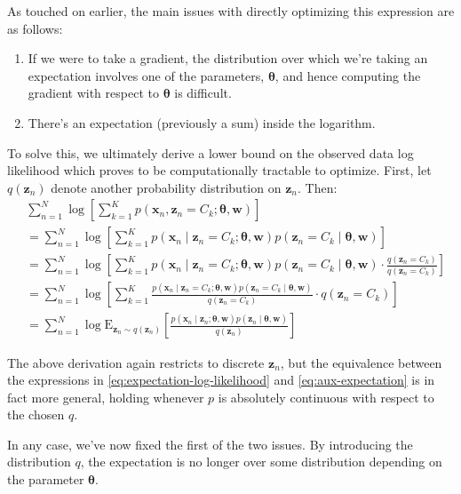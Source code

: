 As touched on earlier, the main issues with directly optimizing this expression are as follows:
\begin{enumerate}
    \item If we were to take a gradient, the distribution over which we're taking an expectation involves one of the parameters, $\boldsymbol\theta$, and hence computing the gradient with respect to $\boldsymbol{\theta}$ is difficult.
    \item There's an expectation (previously a sum) inside the logarithm.
\end{enumerate}

To solve this, we ultimately derive a lower bound on the observed data log likelihood which proves to be computationally tractable to optimize. First, let $q(\mathbf{z}_n)$ denote another probability distribution on $\mathbf{z}_n$. Then:
\begin{align}
    &\sum_{n = 1} ^N \log \left[\sum_{k = 1} ^K p(\mathbf{x}_n, \mathbf{z}_n = C_k; \boldsymbol\theta, \mathbf{w})\right] \\
    &= \sum_{n = 1} ^N \log \left[ \sum_{k = 1} ^K p(\mathbf{x}_n \mid \mathbf{z}_n = C_k; \boldsymbol\theta, \mathbf{w}) p(\mathbf{z}_n = C_k \mid \boldsymbol\theta, \mathbf{w} )\right] \\
    &= \sum_{n = 1} ^N \log \left[\sum_{k = 1} ^K p(\mathbf{x}_n \mid \mathbf{z}_n = C_k; \boldsymbol\theta, \mathbf{w}) p(\mathbf{z}_n = C_k \mid \boldsymbol\theta, \mathbf{w} ) \cdot \frac{q(\mathbf{z}_n = C_k)}{q(\mathbf{z}_n = C_k)}\right] \\
    &= \sum_{n = 1} ^N \log \left[\sum_{k = 1} ^K \frac{p(\mathbf{x}_n \mid \mathbf{z}_n = C_k; \boldsymbol\theta, \mathbf{w}) p(\mathbf{z}_n = C_k \mid \boldsymbol\theta, \mathbf{w} ) }{q(\mathbf{z}_n = C_k)}\cdot q(\mathbf{z}_n = C_k)\right] \\
    &= \sum_{n = 1} ^N \log \mathrm{E}_{\mathbf{z}_n \sim q(\mathbf{z}_n)} \left[\frac{p(\mathbf{x}_n \mid \mathbf{z}_n; \boldsymbol\theta, \mathbf{w}) p(\mathbf{z}_n \mid \boldsymbol\theta, \mathbf{w} ) }{q(\mathbf{z}_n)}\right]\label{eq:aux-expectation}
\end{align}

The above derivation again restricts to discrete $\mathbf{z}_n$, but the equivalence between the expressions in  \eqref{eq:expectation-log-likelihood} and \eqref{eq:aux-expectation} is in fact more general, holding whenever $p$ is absolutely continuous with respect to the chosen $q$. 

In any case, we've now fixed the first of the two issues. By introducing the distribution $q$, the expectation is no longer over some distribution depending on the parameter $\boldsymbol{\theta}$. 

